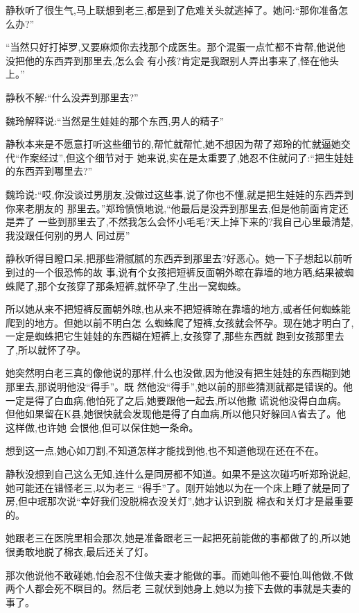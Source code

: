 ﻿\documentclass[12pt]{article}
\begin{document}
静秋听了很生气,马上联想到老三,都是到了危难关头就逃掉了。她问:``那\myrule 你准备怎么办?''

``当然只好打掉罗,又要麻烦你去找那个成医生。那个混蛋一点忙都不肯帮,他说他没把他的东西弄到那里去,怎么会
有小孩?肯定是我跟别人弄出事来了,怪在他头上。''

静秋不解:``什么没弄到那里去?''

魏玲解释说:``当然是\myrule 生娃娃的那个东西,男人的\myrule 精子\myrule ''

静秋本来是不愿意打听这些细节的,帮忙就帮忙,她不想因为帮了郑玲的忙就逼她交代``作案经过'',但这个细节对于
她来说,实在是太重要了,她忍不住就问了:``把生娃娃的东西弄到哪里去?''

魏玲说:``哎,你没谈过男朋友,没做过这些事,说了你也不懂,就是把生娃娃的东西弄到\myrule 你来老朋友的
\myrule 那里去\myrule 。''郑玲愤愤地说,``他最后是没弄到那里去,但是他\myrule 前面\myrule 肯定还是弄了
一些到那里\myrule 去了,不然我怎么会怀\myrule 小毛毛?天上掉下来的?我自己心里最清楚,我没跟任何别的男人
\myrule 同过房\myrule ''

静秋听得目瞪口呆,把那些滑腻腻的东西弄到\myrule 那里去?好恶心。她一下子想起以前听到过的一个很恐怖的故
事,说有个女孩把短裤反面朝外晾在靠墙的地方晒,结果被蜘蛛爬了,那个女孩穿了那条短裤,就怀孕了,生出一窝蜘蛛。

所以她从来不把短裤反面朝外晾,也从来不把短裤晾在靠墙的地方,或者任何蜘蛛能爬到的地方。但她以前不明白怎
么蜘蛛爬了短裤,女孩就会怀孕。现在她才明白了,一定是蜘蛛把它生娃娃的东西糊在短裤上,女孩穿了,那些东西就
跑到女孩\myrule 那里去了,所以就怀了孕。

她突然明白老三真的像他说的那样,什么也没做,因为他没有把生娃娃的东西糊到她那里去,那说明他没``得手''。既
然他没``得手'',她以前的那些猜测就都是错误的。他一定是得了白血病,他怕死了之后,她要跟他一起去,所以他撒
谎说他没得白血病。但他如果留在K县,她很快就会发现他是得了白血病,所以他只好躲回A省去了。他这样做,也许她
会恨他,但可以保住她一条命。


想到这一点,她心如刀割,不知道怎样才能找到他,也不知道他现在还在不在。
 
静秋没想到自己这么无知,连什么是同房都不知道。如果不是这次碰巧听郑玲说起,她可能还在错怪老三,以为老三
``得手''了。刚开始她以为在一个床上睡了就是同了房,但中珉那次说``幸好我们没脱棉衣没关灯'',她才认识到脱
棉衣和关灯才是最重要的。

她跟老三在医院里相会那次,她是准备跟老三一起把死前能做的事都做了的,所以她很勇敢地脱了棉衣,最后还关了灯。

那次他说他不敢碰她,怕会忍不住做夫妻才能做的事。而她叫他不要怕,叫他做,不做两个人都会死不暝目的。然后老
三就伏到她身上,她以为接下去做的事就是夫妻的事了。
\end{document}
